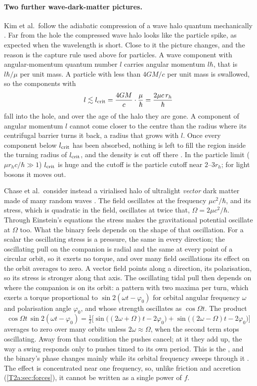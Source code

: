 \paragraph{Two further wave-dark-matter pictures.}
Kim et al.\ follow the adiabatic compression of a wave halo quantum mechanically \cite{Kim2023}. Far from the hole the compressed wave halo looks like the particle spike, as expected when the wavelength is short. Close to it the picture changes, and the reason is the capture rule used above for particles. A wave component with angular-momentum quantum number $l$ carries angular momentum $l\hbar$, that is $l\hbar/\mu$ per unit mass. A particle with less than $4GM/c$ per unit mass is swallowed, so the components with
\[
  l\lesssim l_{\rm crit}=\frac{4GM}{c}\cdot\frac{\mu}{\hbar}=\frac{2\mu c\,r_h}{\hbar}
\]
fall into the hole, and over the age of the halo they are gone. A component of angular momentum $l$ cannot come closer to the centre than the radius where its centrifugal barrier turns it back, a radius that grows with $l$. Once every component below $l_{\rm crit}$ has been absorbed, nothing is left to fill the region inside the turning radius of $l_{\rm crit}$, and the density is cut off there \cite[eq.~(40)]{Kim2023}. In the particle limit ($\mu r_h c/\hbar\gg1$) $l_{\rm crit}$ is huge and the cutoff is the particle cutoff near $2$--$3r_h$; for light bosons it moves out.

Chase et al.\ consider instead a virialised halo of ultralight \emph{vector} dark matter made of many random waves \cite{Chase2025}. The field oscillates at the frequency $\mu c^2/\hbar$, and its stress, which is quadratic in the field, oscillates at twice that, $\Omega=2\mu c^2/\hbar$. Through Einstein's equations the stress makes the gravitational potential oscillate at $\Omega$ too. What the binary feels depends on the shape of that oscillation. For a scalar the oscillating stress is a pressure, the same in every direction; the oscillating pull on the companion is radial and the same at every point of a circular orbit, so it exerts no torque, and over many field oscillations its effect on the orbit averages to zero. A vector field points along a direction, its polarisation, so its stress is stronger along that axis. The oscillating tidal pull then depends on where the companion is on its orbit: a pattern with two maxima per turn, which exerts a torque proportional to $\sin2(\omega t-\varphi_0)$ for orbital angular frequency $\omega$ and polarisation angle $\varphi_0$, and whose strength oscillates as $\cos\Omega t$. The product
\[
  \cos\Omega t\,\sin2(\omega t-\varphi_0)=\tfrac12\big[\sin\big((2\omega+\Omega)t-2\varphi_0\big)+\sin\big((2\omega-\Omega)t-2\varphi_0\big)\big]
\]
averages to zero over many orbits unless $2\omega\approx\Omega$, when the second term stops oscillating. Away from that condition the pushes cancel; at it they add up, the way a swing responds only to pushes timed to its own period. This is the , and the binary's phase changes mainly while its orbital frequency sweeps through it \cite[Sec.~V]{Chase2025}. The effect is concentrated near one frequency, so, unlike friction and accretion (\cref{T2a:sec:forces}), it cannot be written as a single power of $f$.

